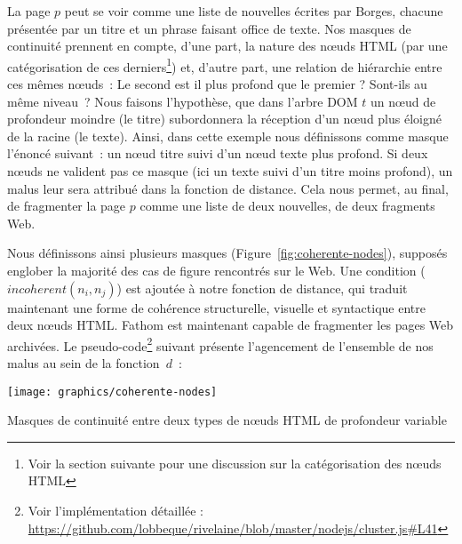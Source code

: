 \documentclass[symmetric,justified,marginals=raggedouter]{tufte-book}
\begin{document}
\noindent La page $p$ peut se voir comme une liste de nouvelles écrites par Borges, chacune présentée par un titre et un phrase faisant office de texte. Nos masques de continuité prennent en compte, d'une part, la nature des nœuds HTML (par une catégorisation de ces derniers\footnote{\RaggedOuter Voir la section suivante pour une discussion sur la catégorisation des nœuds HTML}) et, d'autre part, une relation de hiérarchie entre ces mêmes nœuds~: Le second est il plus profond que le premier ? Sont-ils au même niveau~? Nous faisons l'hypothèse, que dans l'arbre DOM $t$ un nœud de profondeur moindre (le titre) subordonnera la réception d'un nœud plus éloigné de la racine (le texte). Ainsi, dans cette exemple nous définissons comme masque l'énoncé suivant~: un nœud titre suivi d'un nœud texte plus profond. Si deux nœuds ne valident pas ce masque (ici un texte suivi d'un titre moins profond), un malus leur sera attribué dans la fonction de distance. Cela nous permet, au final, de fragmenter la page $p$ comme une liste de deux nouvelles, de deux fragments Web. 

Nous définissons ainsi plusieurs masques (Figure~\ref{fig:coherente-nodes}), supposés englober la majorité des cas de figure rencontrés sur le Web. Une condition ($incoherent(n_i,n_j)$) est ajoutée à notre fonction de distance, qui traduit maintenant une forme de cohérence structurelle, visuelle et syntactique entre deux nœuds HTML. Fathom est maintenant capable de fragmenter les pages Web archivées. Le pseudo-code\footnote{\RaggedOuter Voir l'implémentation détaillée : \url{https://github.com/lobbeque/rivelaine/blob/master/nodejs/cluster.js\#L41}} suivant présente l'agencement de l'ensemble de nos malus au sein de la fonction~$d$~:

\begin{marginfigure}%
  \texttt{[image: graphics/coherente-nodes]}
  \vspace*{0.2cm}  
  \caption{Masques de continuité entre deux types de nœuds HTML de profondeur variable}
  \label{fig:coherente-nodes}
\end{marginfigure}

\begin{algorithm} 
\end{algorithm}
\end{document}
